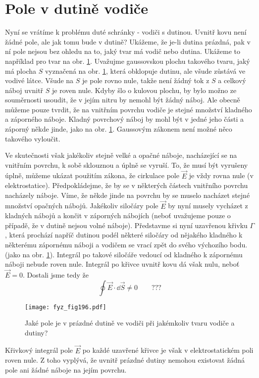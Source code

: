 \section{Pole v dutině vodiče}\label{fyz:IIchapVsecIX}
  Nyní se vrátíme k problému duté schránky - vodiči s dutinou. Uvnitř kovu není žádné pole, ale 
  jak tomu bude v dutině? Ukážeme, že je-li dutina prázdná, pak v ní pole nejsou bez ohledu na 
  to, jaký tvar má vodič nebo dutina. Ukážeme to například pro tvar na obr. \ref{fyz:fig196}. 
  Uvažujme gaussovskou plochu takového tvaru, jaký má plocha \(S\) vyznačená na obr. 
  \ref{fyz:fig196}, která obklopuje dutinu, ale všude zůstává ve vodivé látce. Všude na \(S\) je 
  pole rovno nule, takže není žádný tok z \(S\) a celkový náboj uvnitř \(S\) je roven nule. Kdyby 
  šlo o kulovou plochu, by bylo možno ze souměrnosti usoudit, že v jejím nitru by nemohl být žádný 
  náboj. Ale obecně můžeme pouze tvrdit, že na vnitřním povrchu vodiče je stejné množství kladného 
  a záporného náboje. Kladný povrchový náboj by mohl být v jedné jeho části a záporný někde jinde, 
  jako na obr. \ref{fyz:fig196}. Gaussovým zákonem není možné něco takového vyloučit.
  
  Ve skutečnosti však jakékoliv stejně velké a opačné náboje, nacházející se na vnitřním 
  povrchu, k sobě sklouznou a úplně se vyruší. To, že musí být vyrušeny úplně, můžeme ukázat 
  použitím zákona, že cirkulace pole \(\vec{E}\) je vždy rovna nule (v elektrostatice). 
  Předpokládejme, že by se v některých částech vnitřního povrchu nacházely náboje. Víme, že 
  někde jinde na povrchu by se muselo nacházet stejné množství  opačných nábojů. Jakékoliv 
  siločáry pole \(\vec{E}\) by nyní musely vycházet z kladných nábojů a končit v záporných 
  nábojích (neboť uvažujeme pouze o případě, že v dutině nejsou volné náboje). Představme si 
  nyní uzavřenou křivku \(\Gamma\), která prochází napříč dutinou podél některé siločáry od 
  nějakého kladného k některému zápornému náboji a vodičem se vrací zpět do svého výchozího 
  bodu. (jako na obr. \ref{fyz:fig196}). Integrál po takové siločáře vedoucí od kladného k 
  zápornému náboji nebude roven nule. Integrál po křivce uvnitř kovu dá však nulu, 
  neboť \(\vec{E}=0\). Dostali jsme tedy že
  \begin{equation}\label{fyz:eq_fey_elstat_gauss08}
    \oint \vec{E}\cdot\dd{\vec{S}} \neq 0  \qquad ???
  \end{equation}

  \begin{figure}[ht!] %
    \centering
    \texttt{[image: fyz\_fig196.pdf]}
    \caption{Jaké pole je v prázdné dutině ve vodiči při jakémkoliv tvaru vodiče a dutiny?}
    \label{fyz:fig196}
  \end{figure}
  Křivkový integrál pole \(\vec{E}\) po každé uzavřené křivce je však v elektrostatickém poli 
  roven nule. Z toho vyplývá, že uvnitř prázdné dutiny nemohou existovat žádná pole ani žádné 
  náboje na jejím povrchu.
  
